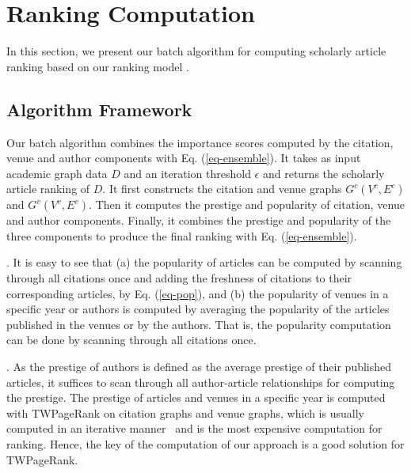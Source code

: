 \section{Ranking Computation}
\label{sec-alg}

In this section, we present our batch algorithm for computing scholarly article ranking based on our ranking model \ensemblerank.

\subsection{Algorithm Framework}
\label{subsec-bat-alg}

Our batch algorithm \batensemble  combines the importance scores computed by the citation, venue and author components with Eq. (\ref{eq-ensemble}). It takes as input academic graph data $D$ and an iteration threshold $\epsilon$ and returns the scholarly article ranking of $D$. It first constructs the citation and venue graphs $G^c(V^c,E^c)$ and $G^v(V^v,E^v)$. Then it computes the prestige and popularity of citation, venue and author components.
Finally, it combines the  prestige and popularity of the three components to produce the final ranking with Eq. (\ref{eq-ensemble}).



. It is easy to see that (a) the popularity of articles can be computed by scanning through all citations once and adding the freshness of citations to their corresponding articles, by Eq. (\ref{eq-pop}), and (b) the popularity of venues in a specific year or authors is computed by averaging the popularity of the articles published in the venues or by the authors.
That is, the popularity computation can be done by scanning through all citations once.


. As the prestige of authors is defined as the average prestige of their published articles, it suffices to scan through all author-article  relationships for computing the prestige. The prestige of  articles and venues in a specific year is computed with TWPageRank on citation graphs and venue graphs, which is usually computed in an iterative manner~\cite{Brin98:PageRank} and is the most expensive computation for ranking. Hence, the key of the computation of our approach is a good solution for TWPageRank.



